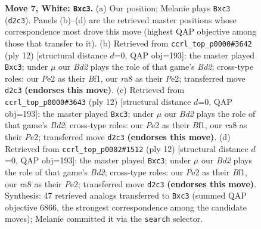 \documentclass[11pt]{article}
\begin{document}
\begin{figure}[p]
\caption{\textbf{Move 7, White: \texttt{Bxc3}.} (a) Our position; Melanie plays \texttt{Bxc3} (\texttt{d2c3}). Panels (b)--(d) are the retrieved master positions whose correspondence most drove this move (highest QAP objective among those that transfer to it). (b) Retrieved from \texttt{ccrl\_top\_p0000\#3642} (ply 12) [structural distance $d$=0, QAP obj=193]: the master played \texttt{Bxc3}; under $\mu$ our \emph{Bd2} plays the role of that game's \emph{Bd2}; cross-type roles: our \emph{P}e2 as their \emph{B}f1, our \emph{r}a8 as their \emph{P}e2; transferred move \texttt{d2c3} \textbf{(endorses this move)}. (c) Retrieved from \texttt{ccrl\_top\_p0000\#3643} (ply 12) [structural distance $d$=0, QAP obj=193]: the master played \texttt{Bxc3}; under $\mu$ our \emph{Bd2} plays the role of that game's \emph{Bd2}; cross-type roles: our \emph{P}e2 as their \emph{B}f1, our \emph{r}a8 as their \emph{P}e2; transferred move \texttt{d2c3} \textbf{(endorses this move)}. (d) Retrieved from \texttt{ccrl\_top\_p0002\#1512} (ply 12) [structural distance $d$=0, QAP obj=193]: the master played \texttt{Bxc3}; under $\mu$ our \emph{Bd2} plays the role of that game's \emph{Bd2}; cross-type roles: our \emph{P}e2 as their \emph{B}f1, our \emph{r}a8 as their \emph{P}e2; transferred move \texttt{d2c3} \textbf{(endorses this move)}. Synthesis: 47 retrieved analogs transferred to \texttt{Bxc3} (summed QAP objective 6866, the strongest correspondence among the candidate moves); Melanie committed it via the \texttt{search} selector.}
\label{fig:thought-m12}
\end{figure}

\clearpage
\end{document}
